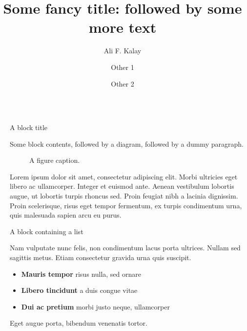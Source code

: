 \documentclass[final]{beamer}
\title{Some fancy title: followed by some more text}
\author{Ali F. Kalay \inst{1} \and Other 1 \inst{2} \and Other 2 \inst{2}}
\institute[shortinst]{\inst{1} Some Institute \samelineand \inst{2} Another Institute}
\newlength{\sepwidth}
\newlength{\colwidth}
\newcommand{\separatorcolumn}{\begin{column}{\sepwidth}\end{column}}
\begin{document}
\begin{frame}[t]
  \begin{columns}[t]
    \separatorcolumn

    \begin{column}{\colwidth}

      \begin{block}{A block title}

        Some block contents, followed by a diagram, followed by a dummy paragraph.

        \begin{figure}
          \centering
          \caption{A figure caption.}
        \end{figure}

        Lorem ipsum dolor sit amet, consectetur adipiscing elit. Morbi ultricies
        eget libero ac ullamcorper. Integer et euismod ante. Aenean vestibulum
        lobortis augue, ut lobortis turpis rhoncus sed. Proin feugiat nibh a
        lacinia dignissim. Proin scelerisque, risus eget tempor fermentum, ex
        turpis condimentum urna, quis malesuada sapien arcu eu purus.

      \end{block}

      \begin{block}{A block containing a list}

        Nam vulputate nunc felis, non condimentum lacus porta ultrices. Nullam sed
        sagittis metus. Etiam consectetur gravida urna quis suscipit.

        \begin{itemize}
          \item \textbf{Mauris tempor} risus nulla, sed ornare
          \item \textbf{Libero tincidunt} a duis congue vitae
          \item \textbf{Dui ac pretium} morbi justo neque, ullamcorper
        \end{itemize}

        Eget augue porta, bibendum venenatis tortor.

      \end{block}


\end{column}
\end{columns}
\end{frame}
\end{document}
